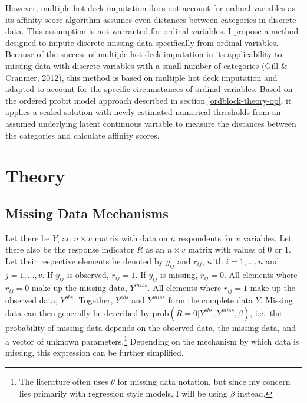 \documentclass[12pt,econ]{sources/authesis}
\begin{document}
However, multiple hot deck imputation does not account for ordinal variables as its affinity score algorithm assumes even distances between categories in discrete data. This assumption is not warranted for ordinal variables. I propose a method designed to impute discrete missing data specifically from ordinal variables. Because of the success of multiple hot deck imputation in its applicability to missing data with discrete variables with a small number of categories (Gill \& Cranmer, 2012), this method is based on multiple hot deck imputation and adapted to account for the specific circumstances of ordinal variables. Based on the ordered probit model approach described in section \ref{ordblock-theory-op}, it applies a scaled solution with newly estimated numerical thresholds from an assumed underlying latent continuous variable to measure the distances between the categories and calculate affinity scores.

\hypertarget{ordmiss-theory}{%
\section{Theory}\label{ordmiss-theory}}

\hypertarget{ordmiss-theory-mechanisms}{%
\subsection{Missing Data Mechanisms}\label{ordmiss-theory-mechanisms}}

Let there be \(Y\), an \(n \times v\) matrix with data on \(n\) respondents for \(v\) variables. Let there also be the response indicator \(R\) as an \(n \times v\) matrix with values of 0 or 1. Let their respective elements be denoted by \(y_{ij}\) and \(r_{ij}\), with \(i = 1, ..., n\) and \(j = 1, ..., v\). If \(y_{ij}\) is observed, \(r_{ij} = 1\). If \(y_{ij}\) is missing, \(r_{ij} = 0\). All elements where \(r_{ij} = 0\) make up the missing data, \(Y^{miss}\). All elements where \(r_{ij} = 1\) make up the observed data, \(Y^{obs}\). Together, \(Y^{obs}\) and \(Y^{miss}\) form the complete data \(Y\). Missing data can then generally be described by \(\text{prob}(R = 0 | Y^{obs}, Y^{miss}, \beta)\), i.e.~the probability of missing data depends on the observed data, the missing data, and a vector of unknown parameters.\footnote{The literature often uses \(\theta\) for missing data notation, but since my concern lies primarily with regression style models, I will be using \(\beta\) instead.} Depending on the mechanism by which data is missing, this expression can be further simplified.
\end{document}
